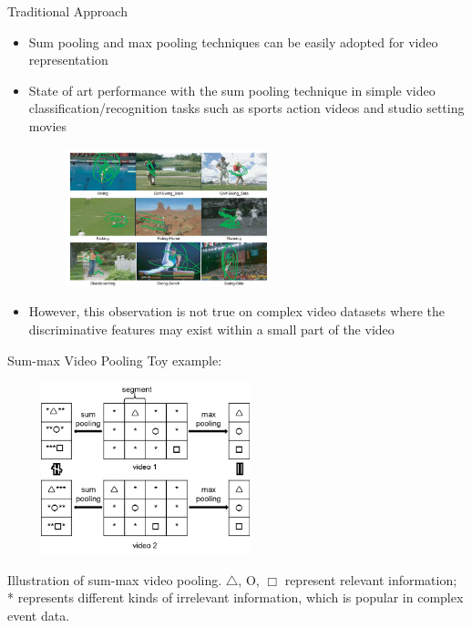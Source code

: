 \documentclass{beamer}
\begin{document}
\begin{frame}[t]{Traditional Approach}

\begin{itemize}
\item Sum pooling and max pooling techniques can be easily adopted for video representation
\item State of art performance with the sum pooling technique in simple video classification/recognition tasks such as sports action videos and studio setting movies
\begin{center}
\includegraphics[width=8cm,height=4cm]{images/ucfsports.jpg}
\end{center}
\item However, this observation is not true on complex video datasets where the discriminative features may exist within a small part of the video
\end{itemize}

\end{frame}



\begin{frame}[t]{Sum-max Video Pooling}
Toy example:
\begin{center}
\includegraphics[width=8cm,height=5cm]{images/sum_max.png}
\end{center}
Illustration of sum-max video pooling. $\triangle$, O, $\Box$ represent relevant information; * represents different kinds of irrelevant information, which is popular in complex event data.
\end{frame}
\end{document}
